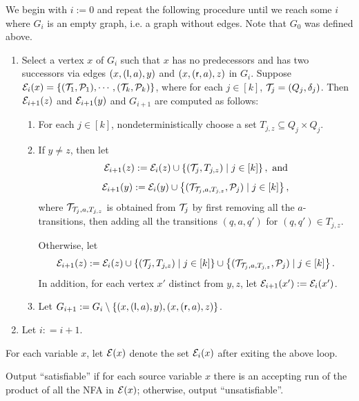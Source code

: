 We begin with $i:= 0$ and repeat the following procedure until we reach some $i$ where $G_i$ is an empty graph, i.e. a graph without edges.
Note that $G_0$ was defined above.
\begin{enumerate}
\item Select a vertex $x$ of $G_i$ such that $x$ has no predecessors  and has two successors via edges $(x, (\mathsf{l}, a), y)$ and $(x, (\mathsf{r},a), z)$ in $G_i$.  Suppose $\mathcal{E}_i(x)=\{(\mathcal{T}_1,\mathcal{P}_1), \cdots, (\mathcal{T}_k, \mathcal{P}_k)\}$, where for each $j \in [k]$, $\mathcal{T}_j = (Q_j, \delta_j)$. Then $\mathcal{E}_{i+1}(z)$ and  $\mathcal{E}_{i+1}(y)$ and $G_{i+1}$ are computed as follows:
\begin{enumerate}
\item For each $j \in [k]$, nondeterministically choose a set $T_{j, z} \subseteq Q_j \times Q_j$.
%
\item If $y \neq z$, then let
$$\mathcal{E}_{i+1}(z):= \mathcal{E}_{i}(z) \cup \left\{(\mathcal{T}_j, T_{j,z}) \mid j \in [k] \right\}, \text{ and}$$
$$\mathcal{E}_{i+1}(y): = \mathcal{E}_{i}(y) \cup \left\{(\mathcal{T}_{\mathcal{T}_j, a, T_{j,z}}, \mathcal{P}_j) \mid j \in [k] \right\},$$
where $\mathcal{T}_{\mathcal{T}_j, a, T_{j,z}}$ is obtained from $\mathcal{T}_j$ by first removing all the $a$-transitions, then adding all the transitions $(q, a, q')$ for $(q,q') \in T_{j,z}$.

Otherwise, let
$$\mathcal{E}_{i+1}(z):= \mathcal{E}_{i}(z) \cup \left\{(\mathcal{T}_j, T_{j,z}) \mid j \in [k] \right\} \cup \left\{(\mathcal{T}_{\mathcal{T}_j, a, T_{j,z}}, \mathcal{P}_j) \mid j \in [k] \right\}.$$
In addition, for each vertex $x'$ distinct from $y, z$, let $\mathcal{E}_{i+1}(x') := \mathcal{E}_i(x')$.
%
\item Let $G_{i+1}:= G_i \setminus \{(x, (\mathsf{l}, a), y), (x, (\mathsf{r},a), z)\}$.
\end{enumerate}
%
\item Let $i: = i+1$.
\end{enumerate}

For each variable $x$, let $\mathcal{E}(x)$ denote the set $\mathcal{E}_i(x)$ after exiting the above loop.

\smallskip

Output ``satisfiable'' if for each source variable $x$ there is an accepting run of the product of all the NFA in $\mathcal{E}(x)$; otherwise, output ``unsatisfiable''.


\smallskip


